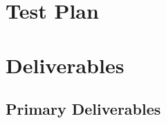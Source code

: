 \documentclass[paper=a4, fontsize=11pt]{report} %
\begin{document}


\chapter{Test Plan} %
\label{cha:test_plan}





\chapter{Deliverables} %
\label{cha:deliverables}

\section{Primary Deliverables} %
\label{sec:primary_deliverables}
\end{document}
